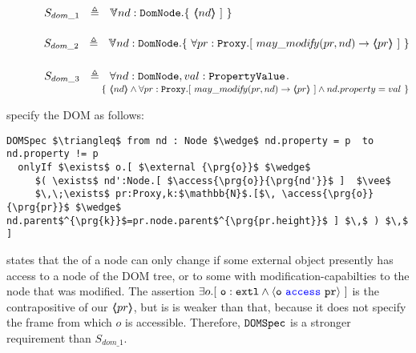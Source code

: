 \noindent
{}
\\
$\strut \SPSP  S_{dom\_1}\ \  \triangleq \ \ \TwoStatesN{ nd:\prg{DomNode}}{\  \inside{nd}\  ] \ }$ 
\\
\noindent
{}
\\
$\strut \SPSP  S_{dom\_2}\ \  \triangleq \ \ \TwoStatesN{ nd:\prg{DomNode}}{\  \forall pr:\prg{Proxy}.[ \ may\_modi\!f\!y(pr, nd) \rightarrow \inside{pr}\  ] \ }$ 
\\
\\
$\strut \SPSP  S_{dom\_3}\ \  \triangleq \ \  \forall{ nd:\prg{DomNode}, val:\prg{PropertyValue} }$.\\
$\strut \SPSP\strut  \SPSP\strut \SPSP	\{ { \  \inside{nd} \wedge \forall pr:\prg{Proxy}.[ \ may\_modi\!f\!y(pr, nd) \rightarrow \inside{pr}\  ]  \wedge nd.property = val} \ \}  $ 





 

\vspace{.1cm}

\citet{OOPSLA22} specify the DOM as follows:
 
 \begin{lstlisting}[language = Chainmail, mathescape=true, frame=lines]
DOMSpec $\triangleq$ from nd : Node $\wedge$ nd.property = p  to nd.property != p
  onlyIf $\exists$ o.[ $\external {\prg{o}}$ $\wedge$ 
     $( \exists$ nd':Node.[ $\access{\prg{o}}{\prg{nd'}}$ ]  $\vee$ 
     $\,\;\exists$ pr:Proxy,k:$\mathbb{N}$.[$\, \access{\prg{o}}{\prg{pr}}$ $\wedge$ nd.parent$^{\prg{k}}$=pr.node.parent$^{\prg{pr.height}}$ ] $\,$ ) $\,$ ]
\end{lstlisting}

 states that the  of a node can only change if
some external object presently has 
access to a node of the DOM tree, or to some  with modification-capabilties
to the node that was modified.
The assertion $\exists {o}.[\ \mbox{\normalfont{\texttt{o}}}:\mbox{\normalfont{\texttt{extl}}} \wedge \langle \mbox{\normalfont{\texttt{o}}}\ {\color{blue}\texttt{access}}\ \mbox{\normalfont{\texttt{pr}}} \rangle\ ]$ is the contrapositive of our  $\langle\!\!\langle pr \rangle\!\!\rangle$, but is is weaker than that, because it does not specify the frame from which $o$ is accessible.
Therefore, $\mbox{\normalfont{\texttt{DOMSpec}}}$ is a stronger requirement than $S_{dom\_1}$.

